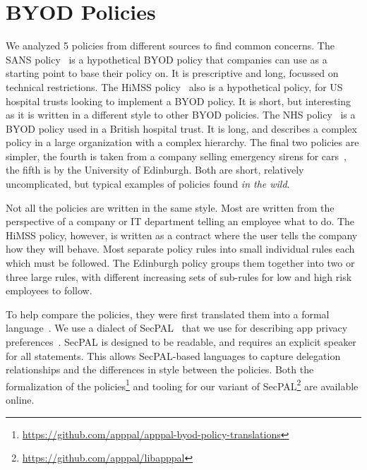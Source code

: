 \documentclass[conference,twocolumn]{IEEEtran}
\begin{document}
\section{BYOD Policies}
\label{sec:byod_policies}

We analyzed 5 policies from different sources to find common concerns.
The SANS policy~\cite{nicholas_r._c._guerin_security_2008} is a hypothetical BYOD policy that companies can use as a starting point to base their policy on.
It is prescriptive and long, focussed on technical restrictions.
The HiMSS policy~\cite{healthcare_information_and_management_systems_society_mobile_2012} also is a hypothetical policy, for US hospital trusts looking to implement a BYOD policy.
It is short, but interesting as it is written in a different style to other BYOD policies.
The NHS policy~\cite{kennington_mobiles_2014} is a BYOD policy used in a British hospital trust.
It is long, and describes a complex policy in a large organization with a complex hierarchy.
The final two policies are simpler, the fourth is taken from a company selling emergency sirens for cars~\cite{code3pse.org_sample_????}, the fifth is by the University of Edinburgh.  
Both are short, relatively uncomplicated, but typical examples of policies found \emph{in the wild}.

Not all the policies are written in the same style.
Most are written from the perspective of a company or IT department telling an employee what to do.
The HiMSS policy, however, is written as a contract where the user tells the company how they will behave.
Most separate policy rules into small individual rules each which must be followed.
The Edinburgh policy groups them together into two or three large rules, with different increasing sets of sub-rules for low and high risk employees to follow.

To help compare the policies, they were first translated them into a formal language~\cite{hallett_specifying_2016}.
We use a dialect of SecPAL~\cite{becker_secpal:_2010} that we use for describing app privacy preferences~\cite{hallett_apppal_2016}.
SecPAL is designed to be readable, and requires an explicit speaker for all statements.
This allows SecPAL-based languages to capture delegation relationships and the differences in style between the policies.
Both the formalization of the policies\footnote{\url{https://github.com/apppal/apppal-byod-policy-translations}} and tooling for our variant of SecPAL\footnote{\url{https://github.com/apppal/libapppal}} are available online.
\end{document}
